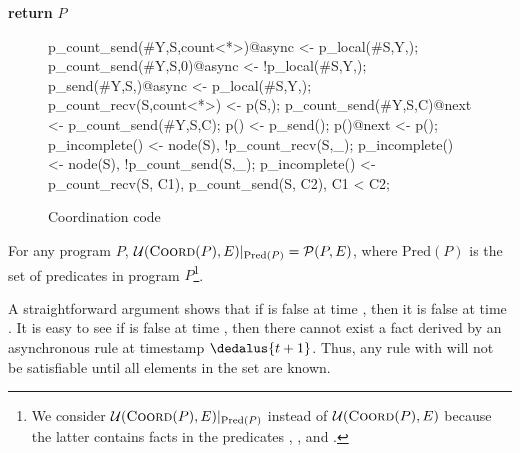 \begin{algorithmic}[1]
  \EndFor
   \label{alg:addrules} %
   \label{alg:lastfor}
  \EndFor
  \EndFor%
  \State \textbf{return} $P$
  \EndProcedure
\end{algorithmic}


\begin{figure}[h!]
\label{fig:coordcode}
\begin{Dedalus}
p_count_send(#Y,S,count<*>)@async <- p_local(#S,Y,);
p_count_send(#Y,S,0)@async <- !p_local(#S,Y,\dbar{_});
p_send(#Y,S,)@async <- p_local(#S,Y,);
p_count_recv(S,count<*>) <- p(S,);
p_count_send(#Y,S,C)@next <- p_count_send(#Y,S,C);
p() <- p_send();
p()@next <- p();
p_incomplete() <- node(S), !p_count_recv(S,_);
p_incomplete() <- node(S), !p_count_send(S,_);
p_incomplete() <- p_count_recv(S, C1),
                  p_count_send(S, C2), C1 < C2;
\end{Dedalus}
\caption{Coordination code}
\end{figure}

\begin{theorem}
For any program $P$, $\mathcal{U}(\textsc{Coord}(P), E)|_{\text{Pred}(P)} = \mathcal{P}(P, E)$, where $\text{Pred}(P)$ is the set of predicates in program $P$\footnote{We consider $\mathcal{U}(\textsc{Coord}(P), E)|_{\text{Pred}(P)}$ instead of $\mathcal{U}(\textsc{Coord}(P), E)$ because the latter contains facts in the predicates , , and .}.
\end{theorem}

A straightforward argument shows that if  is false at time , then it is false at time .  It is easy to see if  is false at time , then there cannot exist a  fact derived by an asynchronous rule at timestamp $\dedalus{t+1}$.  Thus, any rule with  will not be satisfiable until all elements in the  set are known.


